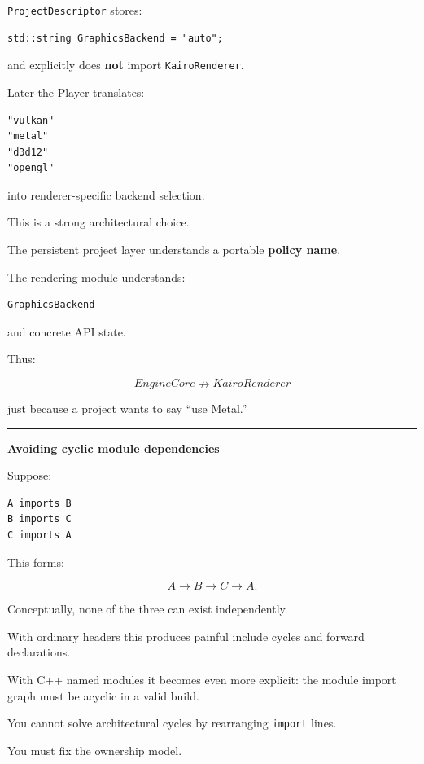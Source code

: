 \texttt{ProjectDescriptor} stores:

\begin{verbatim}
std::string GraphicsBackend = "auto";
\end{verbatim}

and explicitly does \textbf{not} import \texttt{KairoRenderer}.

Later the Player translates:

\begin{verbatim}
"vulkan"
"metal"
"d3d12"
"opengl"
\end{verbatim}

into renderer-specific backend selection.

This is a strong architectural choice.

The persistent project layer understands a portable \textbf{policy name}.

The rendering module understands:

\begin{verbatim}
GraphicsBackend
\end{verbatim}

and concrete API state.

Thus:

\[
EngineCore\nrightarrow KairoRenderer
\]

just because a project wants to say ``use Metal.''

\begin{center}\rule{0.5\linewidth}{0.5pt}\end{center}

\textbf{Avoiding cyclic module dependencies}

Suppose:

\begin{verbatim}
A imports B
B imports C
C imports A
\end{verbatim}

This forms:

\[
A\rightarrow B\rightarrow C\rightarrow A.
\]

Conceptually, none of the three can exist independently.

With ordinary headers this produces painful include cycles and forward declarations.

With C++ named modules it becomes even more explicit: the module import graph must be acyclic in a valid build.

You cannot solve architectural cycles by rearranging \texttt{import} lines.

You must fix the ownership model.

